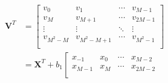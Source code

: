 \begin{equation}
    \label{eq:FIR_block_filtering_w_trans}
    \begin{aligned}
        \bm{V}^T &= \left[\begin{array}{c|c|c|c}
            v_0 & v_1 & \cdots & v_{M-1} \\ 
            v_M & v_{M+1} & \cdots & v_{2M-1} \\
            \vdots & \vdots & \ddots & \vdots \\
            v_{M^2-M} & v_{M^2-M+1} &\cdots & v_{M^2-1} \\
            \end{array}\right] \\
            &= \bm{X}^T + b_1\left[\begin{array}{c|c|c|c}
                x_{-1} & x_0 & \cdots & x_{M-2} \\ 
                x_{M-1} & x_M & \cdots & x_{2M-2} \\

\end{array}
\end{aligned}
\end{equation}
